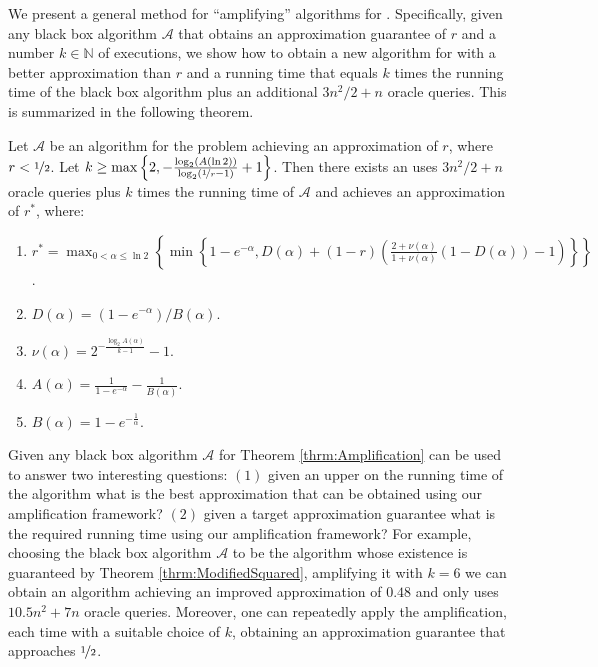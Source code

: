  We present a general method for ``amplifying'' algorithms for \SK.
Specifically, given any black box algorithm $\mathcal{A}$ that obtains an approximation guarantee of $r$ and a number $k\in \mathbb{N}$ of executions, we show how to obtain a new algorithm for \SK with a better approximation than $r$ and a running time that equals $k$ times the running time of the black box algorithm plus an additional  $3n^2/2+n$ oracle queries.
This is summarized in the following theorem.
\begin{theorem}\label{thrm:Amplification}
Let $\mathcal{A}$ be an algorithm for the \SK problem achieving an approximation of $r$, where $r< \nicefrac[]{1}{2}$.
Let $k\geq \max \left\{2, -\frac{\log_2(A(\ln 2))}{\log_2(\nicefrac[]{1}{r} -1 ) }+1 \right\}$.
Then there exists an uses $3n^2/2+n$ oracle queries plus $k$ times the running time of $\mathcal{A}$ and achieves an approximation of $r^*$, where:
\begin{enumerate}
\item $r^* = \max _{0< \alpha \leq \ln{2}} \left\{ \min \left\{ 1-e^{-\alpha},D(\alpha)+(1-r)\left( \frac{2+\nu(\alpha)}{1+\nu(\alpha)} (1-D(\alpha)) -1\right)\right\}\right\}$.
\item $ D(\alpha)=(1-e^{-\alpha})/B(\alpha)$.
\item $\nu(\alpha ) = 2^{-\frac{\log _2 {A(\alpha)}}{k-1}}-1$.
\item $ A(\alpha) = \frac{1}{1-e^{-\alpha}}-\frac{1}{B(\alpha)}$.
\item $ B(\alpha)=1-e^{-\frac{1}{\alpha}}$.
\end{enumerate}
\end{theorem}

Given any black box algorithm $\mathcal{A}$ for \SK Theorem \ref{thrm:Amplification} can be used to answer two interesting questions: $(1)$ given an upper on the running time of the algorithm what is the best approximation that can be obtained using our amplification framework? $(2)$ given a target approximation guarantee what is the required running time using our amplification framework?
For example, choosing the black box algorithm $\mathcal{A}$ to be the algorithm whose existence is guaranteed by Theorem \ref{thrm:ModifiedSquared}, amplifying it with $k=6$ we can obtain an algorithm achieving an improved approximation of $0.48$ and only uses  $10.5n^2+7n$ oracle queries.
Moreover, one can repeatedly apply the amplification, each time with a suitable choice of $k$, obtaining an approximation guarantee that approaches $\nicefrac[]{1}{2}$.

